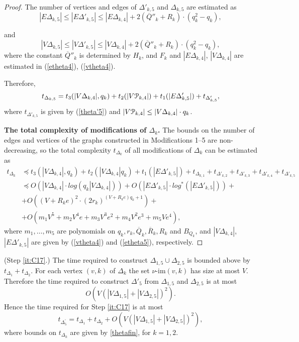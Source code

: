 \documentclass[a4paper,12pt]{article}
\newcommand{\D}{\Delta }
\newcommand{\cP}{{\cal{P}}}
\newcommand{\vim}{\nu\textrm{-im}}
\numberwithin{equation}{section}
\numberwithin{figure}{section}
\begin{document}
\begin{proof}
The number of vertices and edges of $\D'_{k,5}$ and $\D_{k,5}$ are estimated as
\begin{equation}\label{etheta5}
|E\D_{k,5}| \le |E\D'_{k,5}| \le |E\D_{k,4}|+ 2(\overline{Q}''_k+
R_k)\cdot(q_k^2-q_k),
\end{equation}

and
\begin{equation}\label{vtheta5}
|V\D_{k,5}| \le |V \D'_{k,5}| \le |V\D_{k,4}|+2(\overline{Q}''_k+R_k)\cdot(q_k^2-q_k),
\end{equation}
where the constant $\overline{Q}''_k$ is determined by $H_k$, and
$F_k$ and $|E \D_{k,4}|$, $|V \D_{k,4}|$ are estimated in (\ref{etheta4}),
(\ref{vtheta4}).


Therefore,
\begin{equation}\label{theta5}
t_{\D_{k,5}} = t_3(|V \D_{k,4}|, q_k) + t_2(|V\cP_{k,4}|)+ t_1(|E\D'_{k,5}|) +
t_{\D'_{k,5}},
\end{equation}
where $t_{\D'_{k,5}}$ is given by (\ref{theta'5}) and $|V\cP_{k,4}| \le |V
\D_{k,4}|\cdot q_k $.



{\bf The total complexity of modifications of $\D_k$.}
The bounds on the number of
edges and vertices of the graphs constructed
in Modifications 1--5 are non-decreasing, so the
total complexity $t_{\D_k}$
of all modifications of $\D_k$ can be estimated as
\begin{equation}\label{thetafin}
\begin{split}
t_{\D_k} &\preceq t_3(|V \D_{k,4}|, q_k) + t_2(|V \D_{k,4}| q_k )+
t_1(|E\D'_{k,5}|)+t_{\D_{k,1}} + t_{\D'_{k,2}}+t_{\D'_{k,3}}+t_{\D'_{k,4}}+t_{\D'_{k,5}}\\
&\preceq O(|V \D_{k,4}|\cdot log(q_k |V \D_{k,4}|))+O (|E\D'_{k,5}| \cdot log^{\ast}(|E\D'_{k,5}|))+\\
&+O((V +R_k e)^2\cdot (2r_k)^{(V + R_k e) q_k +1})+\\
&+O(m_1 V^5 + m_2V^4 e +m_3 V^3 e^2 +m_4 V^2 e^3 + m_5 V e^4),
\end{split}
\end{equation}
where $m_1, \ldots, m_5$ are polynomials on  $q_k, r_k,
\overline{Q}_k, \overline{R}_k, R_k$ and $B_{Q_k}$, and $|V
\D_{k,4}|$, $|E\D'_{k,5}|$ are given by (\ref{vtheta4}) and
(\ref{etheta5}), respectively.

\end{proof}

\noindent{\bf Reassembly: construction of $\D^\prime_5$.}
(Step \ref{it:C17}.)
The time required to construct $\D_{1,5}\cup \D_{2,5}$ is
bounded above by $t_{\D_1}+ t_{\D_2}$.
For each vertex $(v,k)$ of $\D_k$ the set $\vim(v,k)$ has size
at most $V$. Therefore the time required to construct $\D'_5$ from
$\D_{1,5}$ and  $\D_{2,5}$ is at most
\[O(V(|V\D_{1,5}|+|V\D_{2,5}|)^2).\]
Hence the time required for Step  \ref{it:C17} is at most
\begin{equation}\label{eq:D'_5}
 t_{\D^\prime_5}= t_{\D_1}+ t_{\D_2}+O(V(|V\D_{1,5}|+|V\D_{2,5}|)^2),
\end{equation}
where bounds on $t_{\D_k}$ are given by \eqref{thetafin}, for $k=1,2$.
\end{document}
